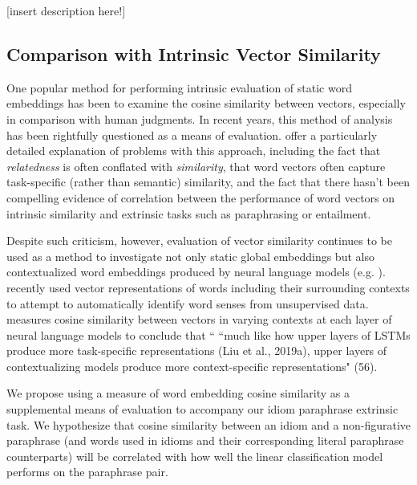 \documentclass[11pt,a4paper]{article}
\begin{document}

\vspace{5mm}
[insert description here!]

\vspace{15mm}



\subsection{Comparison with Intrinsic Vector Similarity}

One popular method for performing intrinsic evaluation of static word embeddings has been to examine the cosine similarity between vectors, especially in comparison with human judgments. In recent years, this method of analysis has been rightfully questioned as a means of evaluation. \citet{faruqui-etal-2016-problems} offer a particularly detailed explanation of problems with this approach, including the fact that \textit{relatedness} is often conflated with \textit{similarity}, that word vectors often capture task-specific (rather than semantic) similarity, and the fact that there hasn't been compelling evidence of correlation between the performance of word vectors on intrinsic similarity and extrinsic tasks such as paraphrasing or entailment.

Despite such criticism, however, evaluation of vector similarity continues to be used as a method to investigate not only static global embeddings but also contextualized word embeddings produced by neural language models (e.g. \citet{van_Aken_2019}). \citet{huang_cho_bowman_2020} recently used vector representations of words including their surrounding contexts to attempt to automatically identify word senses from unsupervised data. \citep{ethayarajh2019contextual} measures cosine similarity between vectors in varying contexts at each layer of neural language models to conclude that `` ``much like how upper layers of LSTMs produce more task-specific
representations (Liu et al., 2019a), upper layers of contextualizing models produce more context-specific representations" (56).

 We propose using a measure of word embedding cosine similarity as a supplemental means of evaluation to accompany our idiom paraphrase extrinsic task. We hypothesize that cosine similarity between an idiom and a non-figurative paraphrase (and words used in idioms and their corresponding literal paraphrase counterparts) will be correlated with how well the linear classification model performs on the paraphrase pair.
 
\end{document}
